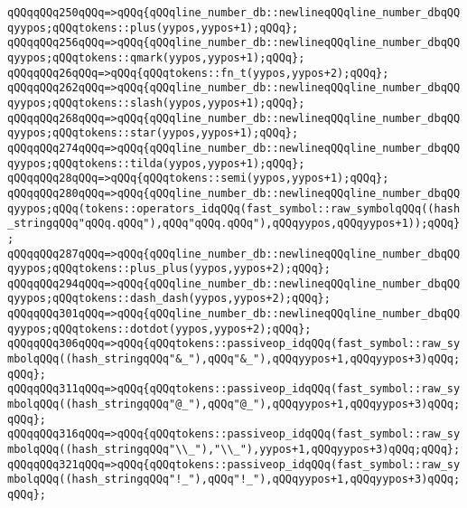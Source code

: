 \verb|qQQqqQQq250qQQq=>qQQq{qQQqline_number_db::newlineqQQqline_number_dbqQQqyypos;qQQqtokens::plus(yypos,yypos+1);qQQq};|\newline
\verb|qQQqqQQq256qQQq=>qQQq{qQQqline_number_db::newlineqQQqline_number_dbqQQqyypos;qQQqtokens::qmark(yypos,yypos+1);qQQq};|\newline
\verb|qQQqqQQq26qQQq=>qQQq{qQQqtokens::fn_t(yypos,yypos+2);qQQq};|\newline
\verb|qQQqqQQq262qQQq=>qQQq{qQQqline_number_db::newlineqQQqline_number_dbqQQqyypos;qQQqtokens::slash(yypos,yypos+1);qQQq};|\newline
\verb|qQQqqQQq268qQQq=>qQQq{qQQqline_number_db::newlineqQQqline_number_dbqQQqyypos;qQQqtokens::star(yypos,yypos+1);qQQq};|\newline
\verb|qQQqqQQq274qQQq=>qQQq{qQQqline_number_db::newlineqQQqline_number_dbqQQqyypos;qQQqtokens::tilda(yypos,yypos+1);qQQq};|\newline
\verb|qQQqqQQq28qQQq=>qQQq{qQQqtokens::semi(yypos,yypos+1);qQQq};|\newline
\verb|qQQqqQQq280qQQq=>qQQq{qQQqline_number_db::newlineqQQqline_number_dbqQQqyypos;qQQq(tokens::operators_idqQQq(fast_symbol::raw_symbolqQQq((hash_stringqQQq"qQQq.qQQq"),qQQq"qQQq.qQQq"),qQQqyypos,qQQqyypos+1));qQQq};|\newline
\verb|qQQqqQQq287qQQq=>qQQq{qQQqline_number_db::newlineqQQqline_number_dbqQQqyypos;qQQqtokens::plus_plus(yypos,yypos+2);qQQq};|\newline
\verb|qQQqqQQq294qQQq=>qQQq{qQQqline_number_db::newlineqQQqline_number_dbqQQqyypos;qQQqtokens::dash_dash(yypos,yypos+2);qQQq};|\newline
\verb|qQQqqQQq301qQQq=>qQQq{qQQqline_number_db::newlineqQQqline_number_dbqQQqyypos;qQQqtokens::dotdot(yypos,yypos+2);qQQq};|\newline
\verb|qQQqqQQq306qQQq=>qQQq{qQQqtokens::passiveop_idqQQq(fast_symbol::raw_symbolqQQq((hash_stringqQQq"&_"),qQQq"&_"),qQQqyypos+1,qQQqyypos+3)qQQq;qQQq};|\newline
\verb|qQQqqQQq311qQQq=>qQQq{qQQqtokens::passiveop_idqQQq(fast_symbol::raw_symbolqQQq((hash_stringqQQq"@_"),qQQq"@_"),qQQqyypos+1,qQQqyypos+3)qQQq;qQQq};|\newline
\verb|qQQqqQQq316qQQq=>qQQq{qQQqtokens::passiveop_idqQQq(fast_symbol::raw_symbolqQQq((hash_stringqQQq"\\_"),"\\_"),yypos+1,qQQqyypos+3)qQQq;qQQq};|\newline
\verb|qQQqqQQq321qQQq=>qQQq{qQQqtokens::passiveop_idqQQq(fast_symbol::raw_symbolqQQq((hash_stringqQQq"!_"),qQQq"!_"),qQQqyypos+1,qQQqyypos+3)qQQq;qQQq};|\newline

